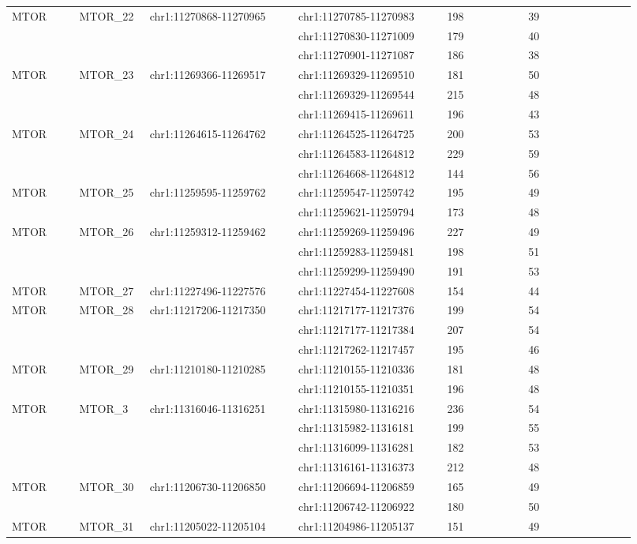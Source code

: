\begin{landscape}
\begin{longtable}{p{0.1\linewidth}|p{0.1\linewidth}p{0.22\linewidth}p{0.22\linewidth}p{0.12\linewidth}p{0.16\linewidth}}
\\
MTOR & MTOR\_22 & chr1:11270868-11270965 & chr1:11270785-11270983 & 198 & 39
\\
 & & & chr1:11270830-11271009 & 179 & 40
\\
 & & & chr1:11270901-11271087 & 186 & 38
\\
MTOR & MTOR\_23 & chr1:11269366-11269517 & chr1:11269329-11269510 & 181 & 50
\\
 & & & chr1:11269329-11269544 & 215 & 48
\\
 & & & chr1:11269415-11269611 & 196 & 43
\\
MTOR & MTOR\_24 & chr1:11264615-11264762 & chr1:11264525-11264725 & 200 & 53
\\
 & & & chr1:11264583-11264812 & 229 & 59
\\
 & & & chr1:11264668-11264812 & 144 & 56
\\
MTOR & MTOR\_25 & chr1:11259595-11259762 & chr1:11259547-11259742 & 195 & 49
\\
 & & & chr1:11259621-11259794 & 173 & 48
\\
MTOR & MTOR\_26 & chr1:11259312-11259462 & chr1:11259269-11259496 & 227 & 49
\\
 & & & chr1:11259283-11259481 & 198 & 51
\\
 & & & chr1:11259299-11259490 & 191 & 53
\\
MTOR & MTOR\_27 & chr1:11227496-11227576 & chr1:11227454-11227608 & 154 & 44
\\
MTOR & MTOR\_28 & chr1:11217206-11217350 & chr1:11217177-11217376 & 199 & 54
\\
 & & & chr1:11217177-11217384 & 207 & 54
\\
 & & & chr1:11217262-11217457 & 195 & 46
\\
MTOR & MTOR\_29 & chr1:11210180-11210285 & chr1:11210155-11210336 & 181 & 48
\\
 & & & chr1:11210155-11210351 & 196 & 48
\\
MTOR & MTOR\_3 & chr1:11316046-11316251 & chr1:11315980-11316216 & 236 & 54
\\
 & & & chr1:11315982-11316181 & 199 & 55
\\
 & & & chr1:11316099-11316281 & 182 & 53
\\
 & & & chr1:11316161-11316373 & 212 & 48
\\
MTOR & MTOR\_30 & chr1:11206730-11206850 & chr1:11206694-11206859 & 165 & 49
\\
 & & & chr1:11206742-11206922 & 180 & 50
\\
MTOR & MTOR\_31 & chr1:11205022-11205104 & chr1:11204986-11205137 & 151 & 49

\end{longtable}
\end{landscape}
